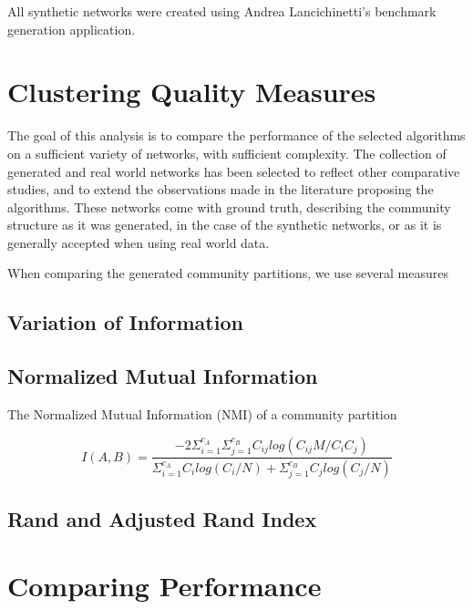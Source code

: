 All synthetic networks were created using Andrea Lancichinetti's benchmark generation application.


\section{Clustering Quality Measures}
The goal of this analysis is to compare the performance of the selected algorithms on a sufficient variety of networks, with sufficient complexity. The collection of generated and real world networks has been selected to reflect other comparative studies, and to extend the observations made in the literature proposing the algorithms. These networks come with ground truth, describing the community structure as it was generated, in the case of the synthetic networks, or as it is generally accepted when using real world data.

When comparing the generated community partitions, we use several measures

\subsection{Variation of Information}
\cite{Marina2007}

\subsection{Normalized Mutual Information}
The Normalized Mutual Information (NMI) of a community partition 

$$I(A,B)=\dfrac{-2\Sigma_{i=1}^{c_A}\Sigma_{j=1}^{c_B}C_{ij}log(C_{ij}M/C_iC_j)}{\Sigma_{i=1}^{c_A}
	C_ilog(C_i/N)+\Sigma_{j=1}^{c_B}C_jlog(C_j/N)}$$

\subsection{Rand and Adjusted Rand Index}
\cite{rand1971}


\section{Comparing Performance}

